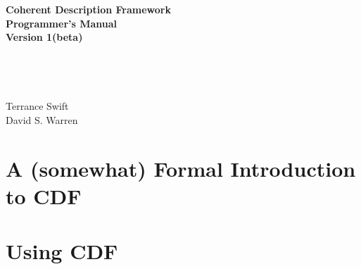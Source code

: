 \documentclass[11pt]{report}
\newcommand{\version}{Version 1(beta)}
\begin{document}
\begin{center}
{\Huge
{\bf Coherent Description Framework \\ Programmer's Manual \\ \version }
\ \\ \ \\ }
{\Large
\ \\ \ \\ \ \\
Terrance Swift \\ David S. Warren
}
\end{center}

\date{}

\newpage
\thispagestyle{empty}



\thispagestyle{empty}

\newpage
\thispagestyle{empty}
\tableofcontents
\newpage        %
  



\part{A (somewhat) Formal Introduction to CDF} \label{part:semantics}


  
  


\part{Using CDF}





%
%

%

%



%

\printindex
\end{document}

